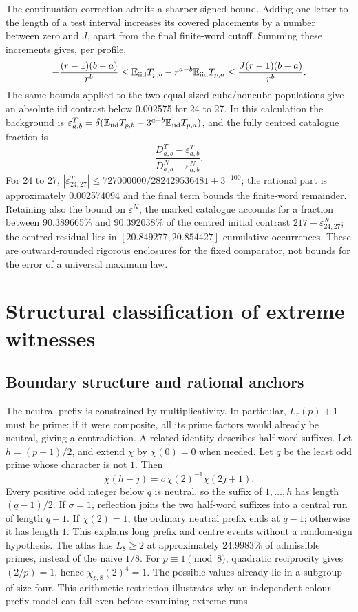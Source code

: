 \documentclass[11pt]{article}
\theoremstyle{definition}\newtheorem{definition}[theorem]{Definition}
\newcommand{\EE}{\mathbb E}
\begin{document}
The continuation correction admits a sharper signed
bound. Adding one letter to the length of a
test interval increases its covered placements
by a number between zero and $J$, apart from
the final finite-word cutoff. Summing these
increments gives, per profile,
\[
 -\frac{(r-1)(b-a)}{r^b}
 \le \EE_{\rm iid}T_{p,b}
       -r^{a-b}\EE_{\rm iid}T_{p,a}
 \le\frac{J(r-1)(b-a)}{r^b}.
\]
The same bounds applied to the two equal-sized
cube/noncube populations give an absolute
iid contrast below 0.002575 for 24 to 27.
In this calculation the background is
$\varepsilon^T_{a,b}=\delta(\EE_{\rm iid}T_{p,b}
-3^{a-b}\EE_{\rm iid}T_{p,a})$, and the fully centred catalogue
fraction is
\[
 \frac{D^T_{a,b}-\varepsilon^T_{a,b}}
      {D^N_{a,b}-\varepsilon^N_{a,b}}.
\]
For 24 to 27,
$|\varepsilon^T_{24,27}|\le727000000/282429536481+3^{-100}$;
the rational part is approximately 0.002574094 and the final term
bounds the finite-word remainder.
Retaining also the bound on $\varepsilon^N$, the marked
catalogue accounts for a fraction between
90.389665\% and 90.392038\% of the
centred initial contrast $217-\varepsilon^N_{24,27}$;
the centred residual lies in
$[20.849277,20.854427]$ cumulative occurrences.
These are outward-rounded rigorous enclosures
for the fixed comparator, not bounds for the
error of a universal maximum law.

\section{Structural classification of extreme witnesses}\label{sec:classification}
\subsection{Boundary structure and rational anchors}
The neutral prefix is constrained by multiplicativity. In particular,
$L_r(p)+1$ must be prime: if it were composite, all its prime factors
would already be neutral, giving a contradiction. A related identity
describes half-word suffixes. Let $h=(p-1)/2$, and extend $\chi$ by
$\chi(0)=0$ when needed. Let $q$ be the least odd prime whose character
is not $1$. Then
\[
 \chi(h-j)=\sigma\chi(2)^{-1}\chi(2j+1).
\]
Every positive odd integer below $q$ is neutral, so the suffix of
$1,\ldots,h$ has length $(q-1)/2$. If $\sigma=1$, reflection joins
the two half-word suffixes into a central run of length $q-1$.
If $\chi(2)=1$, the ordinary neutral prefix ends at $q-1$; otherwise
it has length $1$. This explains long prefix and centre events without
a random-sign hypothesis.
The atlas has $L_8\ge2$ at approximately $24.9983\%$ of admissible
primes, instead of the naive $1/8$. For $p\equiv1\pmod8$, quadratic
reciprocity gives $(2/p)=1$, hence $\chi_{p,8}(2)^4=1$. The possible
values already lie in a subgroup of size four. This arithmetic
restriction illustrates why an independent-colour prefix model can
fail even before examining extreme runs.
\end{document}

